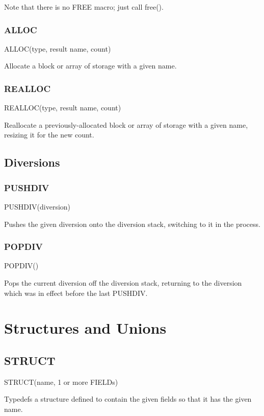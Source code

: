 \documentclass{article}
\begin{document}
Note that there is no FREE macro; just call free().


\subsubsection{ALLOC}

ALLOC(type, result name, count)

Allocate a block or array of storage with a given name.


\subsubsection{REALLOC}

REALLOC(type, result name, count)

Reallocate a previously-allocated block or array of storage with a
given name, resizing it for the new count.


\subsection{Diversions}


\subsubsection{PUSHDIV}

PUSHDIV(diversion)

Pushes the given diversion onto the diversion stack, switching to
it in the process.


\subsubsection{POPDIV}

POPDIV()

Pops the current diversion off the diversion stack, returning to the
diversion which was in effect before the last PUSHDIV.


\section{Structures and Unions}


\subsection{STRUCT}

STRUCT(name, 1 or more FIELDs)

Typedefs a structure defined to contain the given fields so that it
has the given name.
\end{document}
